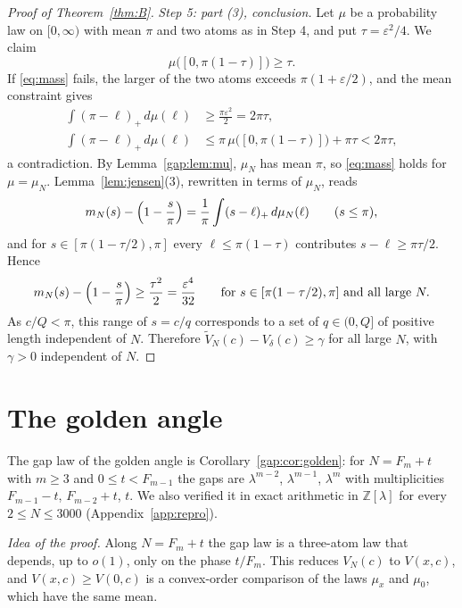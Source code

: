 \documentclass[11pt]{amsart}
\theoremstyle{remark}
\newcommand{\Vd}{V_\delta}
\begin{document}
\begin{proof}[Proof of Theorem~\ref{thm:B}]
\emph{Step 5: part (3), conclusion.} Let $\mu$ be a probability law on $[0,\infty)$ with
mean $\pi$ and two atoms as in Step 4, and put $\tau=\varepsilon^2/4$. We claim
\begin{equation}\label{eq:mass}
\mu\bigl([0,\pi(1-\tau)]\bigr)\ge\tau .
\end{equation}
If \eqref{eq:mass} fails, the larger of the two atoms exceeds $\pi(1+\varepsilon/2)$, and
the mean constraint gives
\begin{align*}
\int(\pi-\ell)_+\,d\mu(\ell)&\ge\frac{\pi\varepsilon^2}{2}=2\pi\tau,\\
\int(\pi-\ell)_+\,d\mu(\ell)&\le\pi\,\mu\bigl([0,\pi(1-\tau)]\bigr)+\pi\tau<2\pi\tau ,
\end{align*}
a contradiction. By Lemma~\ref{gap:lem:mu}, $\mu_N$ has mean $\pi$, so \eqref{eq:mass}
holds for $\mu=\mu_N$. Lemma~\ref{lem:jensen}(3), rewritten in terms of $\mu_N$, reads
\[
m_N(s)-\Bigl(1-\frac s\pi\Bigr)=\frac1\pi\int(s-\ell)_+\,d\mu_N(\ell)\qquad(s\le\pi),
\]
and for $s\in[\pi(1-\tau/2),\pi]$ every $\ell\le\pi(1-\tau)$ contributes $s-\ell\ge\pi\tau/2$. Hence
\begin{equation}\label{eq:excess}
m_N(s)-\Bigl(1-\frac s\pi\Bigr)\ge\frac{\tau^2}{2}=\frac{\varepsilon^4}{32}
\qquad\text{for }s\in[\pi(1-\tau/2),\pi]\text{ and all large }N.
\end{equation}
As $c/Q<\pi$, this range of $s=c/q$ corresponds to a set of $q\in(0,Q]$ of positive length
independent of $N$. Therefore $\widetilde V_N(c)-\Vd(c)\ge\gamma$ for all large $N$, with
$\gamma>0$ independent of $N$.
\end{proof}

\section{The golden angle}\label{sec:golden}

The gap law of the golden angle is Corollary~\ref{gap:cor:golden}: for $N=F_m+t$ with
$m\ge3$ and $0\le t<F_{m-1}$ the gaps are $\lambda^{m-2}$, $\lambda^{m-1}$, $\lambda^m$
with multiplicities $F_{m-1}-t$, $F_{m-2}+t$, $t$. We also verified it in exact
arithmetic in $\mathbb Z[\lambda]$ for every $2\le N\le3000$ (Appendix~\ref{app:repro}).

\emph{Idea of the proof.} Along $N=F_m+t$ the gap law is a three-atom law that depends, up to $o(1)$, only on the phase $t/F_m$. This reduces $V_N(c)$ to $V(x,c)$, and $V(x,c)\ge V(0,c)$ is a convex-order comparison of the laws $\mu_x$ and $\mu_0$, which have the same mean.
\end{document}
